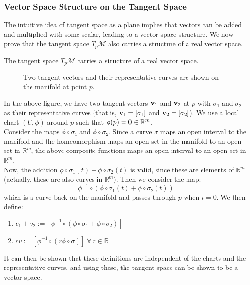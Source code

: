 \subsubsection{Vector Space Structure on the Tangent Space}
The intuitive idea of tangent space as a plane implies that vectors can be added and multiplied with some scalar, leading to a vector space structure. We now prove that the tangent space $T_p\mathcal{M}$ also carries a structure of a real vector space. 
\begin{theorem}
  The tangent space $T_p\mathcal{M}$ carries a structure of a real vector space.
\end{theorem}
\begin{figure}[H]
  \centering 
  
  \caption{Two tangent vectors and their representative curves are shown on the manifold at point $p$.}
\end{figure}
\noindent
In the above figure, we have two tangent vectors $\boldsymbol{\mathbf{v}}_1$ and $\boldsymbol{\mathbf{v}}_2$ at $p$ with $\sigma_1$ and $\sigma_2$ as their representative curves (that is, $\boldsymbol{\mathbf{v}}_1 = [\sigma_1]$ and $\boldsymbol{\mathbf{v}}_2 = [\sigma_2]$). We use a local chart $(U,\phi)$ around $p$ such that $\phi(p) = \boldsymbol{\mathbf{0}} \in \mathbb{R}^m$.\\[0.3cm]
Consider the maps $\phi \circ \sigma_1$ and $\phi \circ \sigma_2$. Since a curve $\sigma$ maps an open interval to the manifold and the homeomorphism maps an open set in the manifold to an open set in $\mathbb{R}^m$, the above composite functions maps an open interval to an open set in $\mathbb{R}^m$.\\[0.3cm]
Now, the addition $\phi \circ \sigma_1 (t) + \phi \circ \sigma_2(t)$ is valid, since these are elements of $\mathbb{R}^m$ (actually, these are also curves in $\mathbb{R}^m$). Then we consider the map:
$$\phi^{-1}\circ (\phi \circ \sigma_1 (t) + \phi \circ \sigma_2(t))$$
which is a curve back on the manifold and passes through $p$ when $t=0$. We then define:
\begin{enumerate}
  \item $v_1+v_2 :=[\phi^{-1}\circ (\phi \circ \sigma_1  + \phi \circ \sigma_2)]$
  \item $rv :=[\phi^{-1}\circ (r\phi \circ \sigma )]\ \forall \ r\in \mathbb{R}$ 
\end{enumerate}
It can then be shown that these definitions are independent of the charts and the representative curves, and using these, the tangent space can be shown to be a vector space.
